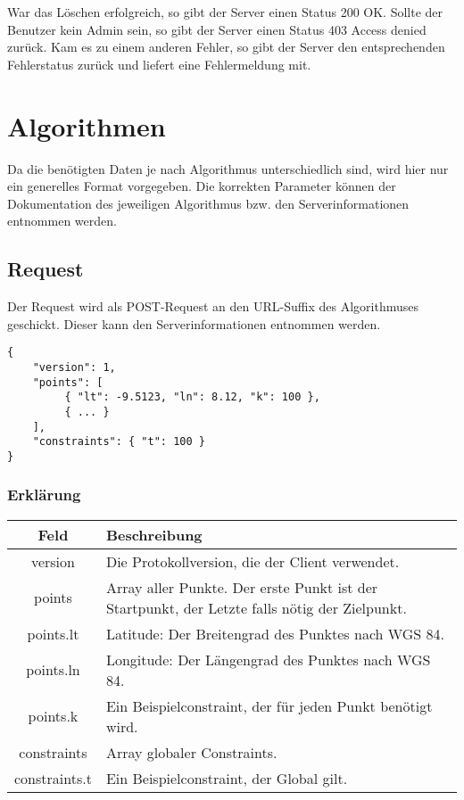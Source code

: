 \documentclass[ngerman]{scrartcl}
\begin{document}
		War das Löschen erfolgreich, so gibt der Server einen Status 200 OK.
		Sollte der Benutzer kein Admin sein, so gibt der Server einen Status 403 Access denied zurück.
		Kam es zu einem anderen Fehler, so gibt der Server den entsprechenden Fehlerstatus zurück und liefert eine Fehlermeldung mit.
		
   	
\section{Algorithmen}

Da die benötigten Daten je nach Algorithmus unterschiedlich sind, wird hier nur ein generelles Format vorgegeben. Die korrekten Parameter können der Dokumentation des jeweiligen Algorithmus bzw. den Serverinformationen entnommen werden.

	\subsection*{Request}
	
	Der Request wird als POST-Request an den URL-Suffix des Algorithmuses geschickt. Dieser kann den Serverinformationen entnommen werden.
	
	\begin{lstlisting}
{
    "version": 1,
    "points": [
         { "lt": -9.5123, "ln": 8.12, "k": 100 },
         { ... }
    ],
    "constraints": { "t": 100 }
}    	
	\end{lstlisting}
	
		\subsubsection*{Erklärung}
	
	    \noindent \begin{tabular}{|c|p{12cm}|}
	    	\hline
	    	\textbf{Feld} & \textbf{Beschreibung} \\ 
	    	\hline \hline
	    	
	    	version & Die Protokollversion, die der Client verwendet.\\
	    	\hline
	    	
	    	points & Array aller Punkte. Der erste Punkt ist der Startpunkt, der Letzte falls nötig der Zielpunkt. \\ 
	    	\hline
	    	
	    	points.lt & Latitude: Der Breitengrad des Punktes nach WGS 84. \\ 
	    	\hline
	    	
	    	points.ln & Longitude: Der Längengrad des Punktes nach WGS 84. \\
	    	\hline
	    	
	    	points.k & Ein Beispielconstraint, der für jeden Punkt benötigt wird.\\ 
	    	\hline
	    	
	    	constraints & Array globaler Constraints.\\ 
	    	\hline
	    	
	    	constraints.t & Ein Beispielconstraint, der Global gilt.\\ 
	    	\hline
	    \end{tabular}
    
\end{document}
